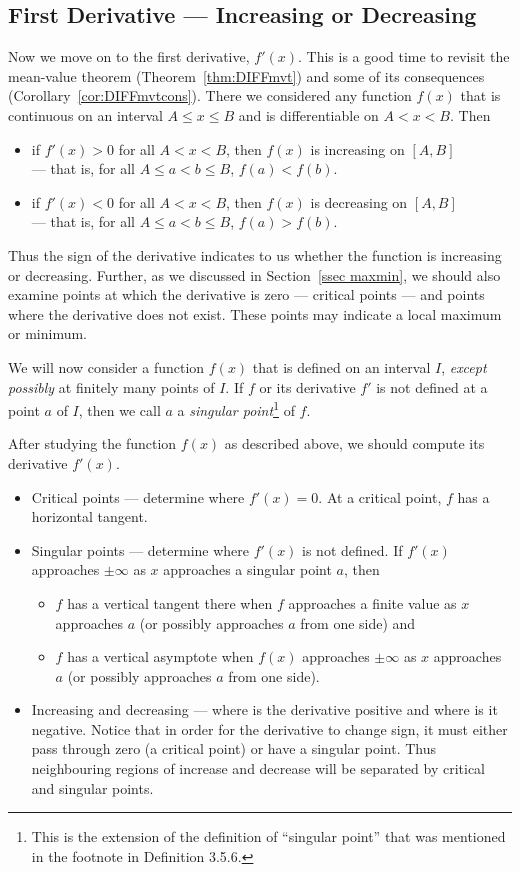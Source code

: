 \subsection{First Derivative --- Increasing or Decreasing}\label{ssec_sketch_FD}
Now we move on to the first derivative, $f'(x)$. This is a good time to revisit the
mean-value theorem (Theorem~\ref{thm:DIFFmvt}) and some of its consequences
(Corollary~\ref{cor:DIFFmvtcons}). There we considered any function $f(x)$ that is 
continuous on an interval $A\le x\le B$ and is differentiable on $A<x<B$. Then
\begin{itemize}
 \item if $f'(x)>0$ for all $A<x<B$, then $f(x)$ is increasing on $[A,B]$\\
  --- that is, for all $A\le a<b\le B$, $f(a)< f(b)$.
 \item if $f'(x)<0$ for all $A<x<B$, then $f(x)$ is decreasing on $[A,B]$\\
  --- that is, for all $A\le a<b\le B$, $f(a) > f(b)$.
\end{itemize}
Thus the sign of the derivative indicates to us whether the function is increasing or
decreasing. Further, as we discussed in Section~\ref{ssec maxmin}, we should also examine
points at which the derivative is zero --- critical points --- and points where the derivative
does not exist. These points may indicate a local maximum or minimum.

We will now consider a function $f(x)$ that is defined on an interval $I$, 
\emph{except possibly} at finitely many points of $I$. If $f$ or its derivative $f'$ 
is not defined at a point $a$ of $I$, then we call $a$ a 
\emph{singular point}\footnote{This is the extension of the definition of ``singular point'' that was mentioned in the footnote in Definition 3.5.6.} of $f$.

After studying the function $f(x)$ as described above, we should compute its derivative
$f'(x)$.
\begin{itemize}
 \item Critical points --- determine where $f'(x)=0$. At a critical point, $f$ has a
horizontal tangent.
 \item Singular points --- determine where $f'(x)$ is not defined.  If $f'(x)$
approaches $\pm\infty$ as $x$ approaches a singular point $a$, then 
\begin{itemize}
\item
$f$ has a vertical tangent there when $f$ approaches a finite value as $x$ approaches $a$
(or possibly approaches $a$ from one side) and 
\item
$f$ has a vertical asymptote when $f(x)$
approaches $\pm\infty$ as $x$ approaches $a$ (or possibly approaches $a$ from
one side).
\end{itemize}

 \item Increasing and decreasing --- where is the derivative positive and where is it
negative. Notice that in order for the derivative to change sign, it must either pass
through zero (a critical point) or have a singular point. Thus neighbouring regions of
increase and decrease will be separated by critical and singular points.
\end{itemize}

